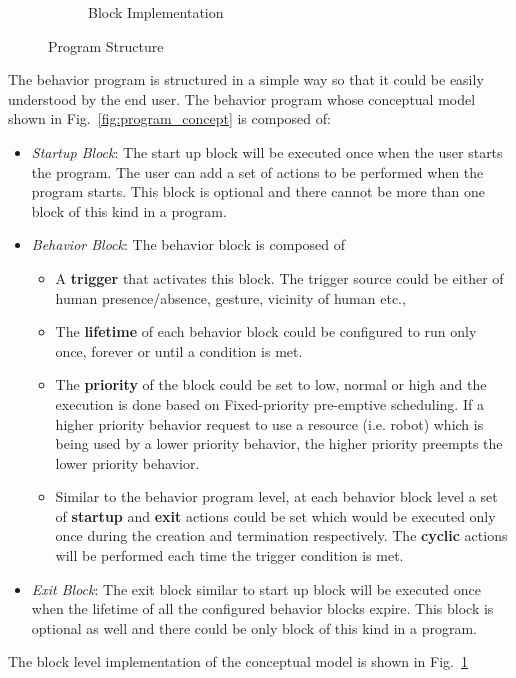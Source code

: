 \documentclass{llncs}
\begin{document}
\begin{figure}
\begin{subfigure}[t]{0.48\textwidth}
\caption[Block Implementation]{Block Implementation}
\label{fig:program_blocks}
\end{subfigure}
\caption[Program Structure]{Program Structure}
\label{fig:program}
\end{figure}
The behavior program is structured in a simple way so that it could be easily understood by the end user. The behavior program whose conceptual model shown in Fig.~\ref{fig:program_concept} is composed of:
\begin{itemize}
\item \emph{Startup Block}: The start up block will be executed once when the user starts the program. The user can add a set of actions to be performed when the program starts. This block is optional and there cannot be more than one block of this kind in a program.
\item \emph{Behavior Block}: The behavior block is composed of
\begin{itemize}
\item A \textbf{trigger} that activates this block. The trigger source could be either of human presence/absence, gesture, vicinity of human etc.,
\item The \textbf{lifetime} of each behavior block could be configured to run only once, forever or until a condition is met. 
\item The \textbf{priority} of the block could be set to low, normal or high and the execution is done based on Fixed-priority pre-emptive scheduling. If a higher priority behavior request to use a resource (i.e. robot) which is being used by a lower priority behavior, the higher priority preempts the lower priority behavior.
\item Similar to the behavior program level, at each behavior block level a set of \textbf{startup} and \textbf{exit} actions could be set which would be executed only once during the creation and termination respectively. The \textbf{cyclic} actions will be performed each time the trigger condition is met.
\end{itemize}
\item \emph{Exit Block}: The exit block similar to start up block will be executed once when the lifetime of all the configured behavior blocks expire. This block is optional as well and there could be only block of this kind in a program.
\end{itemize}
The block level implementation of the conceptual model is shown in Fig.~\ref{fig:program_blocks}
\end{document}
